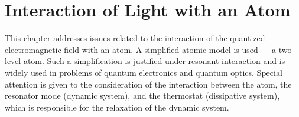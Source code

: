\chapter{Interaction of Light with an Atom}
\label{chInteraction}

This chapter addresses issues related to the interaction of the quantized electromagnetic field with an atom. A simplified atomic model is used — a two-level atom. Such a simplification is justified under resonant interaction and is widely used in problems of quantum electronics and quantum optics. Special attention is given to the consideration of the interaction between the atom, the resonator mode (dynamic system), and the thermostat (dissipative system), which is responsible for the relaxation of the dynamic system.  

















